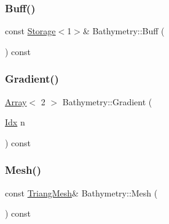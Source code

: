 \mbox{\label{structBathymetry_ad0bff54b04bec3c1ef57edde852bf26c}} 
\subsubsection{\texorpdfstring{Buff()}{Buff()}}
{\footnotesize\ttfamily const \hyperlink{Includes_8h_ae7d375db701e28425a3faea2827f134b}{Storage}$<$1$>$\& Bathymetry\+::\+Buff (\begin{DoxyParamCaption}{ }\end{DoxyParamCaption}) const\hspace{0.3cm}{\ttfamily [inline]}}

\mbox{\label{structBathymetry_a7d7ef1d3154c6236acedb0faa5ab9a76}} 
\subsubsection{\texorpdfstring{Gradient()}{Gradient()}}
{\footnotesize\ttfamily \hyperlink{Includes_8h_abd9de33944f934950000c3929e14ad8d}{Array}$<$ 2 $>$ Bathymetry\+::\+Gradient (\begin{DoxyParamCaption}\item[{\hyperlink{Includes_8h_ae78891cd308078a2f5f9e7193065c805}{Idx}}]{n }\end{DoxyParamCaption}) const}

\mbox{\label{structBathymetry_a2344e707a6092a2fe753d9d983675270}} 
\subsubsection{\texorpdfstring{Mesh()}{Mesh()}}
{\footnotesize\ttfamily const \hyperlink{structTriangMesh}{Triang\+Mesh}\& Bathymetry\+::\+Mesh (\begin{DoxyParamCaption}{ }\end{DoxyParamCaption}) const\hspace{0.3cm}{\ttfamily [inline]}}

\mbox{\label{structBathymetry_a9e37db46f1707e16a291e45922201ba7}} 
